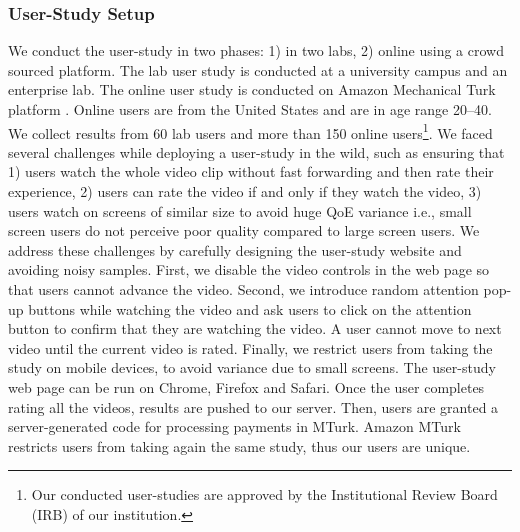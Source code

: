 \subsubsection{User-Study Setup}
We conduct the user-study in two phases: 1) in two labs, 2) online using a crowd sourced platform. The lab user study is conducted at a university campus and an enterprise lab. The online user study is conducted on Amazon Mechanical Turk platform \cite{turk-amazon}. Online users are from the United States and are in age range 20--40. We collect results from 60 lab users and more than 150 online users\footnote{Our conducted user-studies are approved by the Institutional Review Board (IRB) of our institution.}. We faced several challenges  while deploying a user-study in the wild, such as ensuring that 1) users watch the whole video clip without fast forwarding and then rate their experience, 2) users can rate the video if and only if they watch the video, 3) users watch on screens of similar size  to avoid huge QoE variance i.e., small screen users do not perceive poor quality compared to large screen users. We address these challenges by carefully designing the user-study website and avoiding noisy samples. First, we disable the video controls in the web page so that users cannot advance the video. Second, we introduce random attention pop-up buttons while watching the video and ask users to click on the attention button to confirm that they are watching the video. A user cannot move to next video until the current video is rated. Finally, we restrict users from taking the study on mobile devices, to avoid variance due to small screens. The user-study web page can be run on Chrome, Firefox and Safari. Once the user completes rating all the videos, results are pushed to our server. Then, users are granted a server-generated code  for processing payments in MTurk. Amazon MTurk restricts users from taking again the same study, thus our users are unique.

